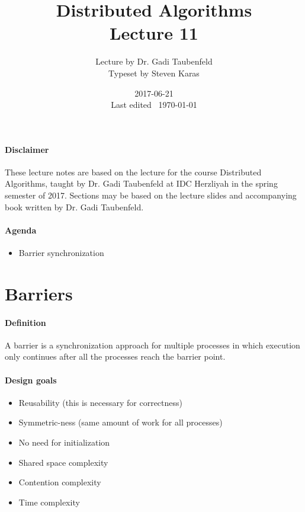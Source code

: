 \documentclass{idc_msc}
\title{Distributed Algorithms\\\large Lecture 11}
\date{2017-06-21 \\ Last edited \currenttime\ \today}
\author{Lecture by Dr. Gadi Taubenfeld\\Typeset by Steven Karas}
\begin{document}
\maketitle

\paragraph{Disclaimer}

These lecture notes are based on the lecture for the course Distributed Algorithms, taught by Dr. Gadi Taubenfeld at IDC Herzliyah in the spring semester of 2017.
Sections may be based on the lecture slides and accompanying book written by Dr. Gadi Taubenfeld.

\paragraph{Agenda}

\begin{itemize}
  \item Barrier synchronization
\end{itemize}

\section{Barriers}

\paragraph{Definition}
A barrier is a synchronization approach for multiple processes in which execution only continues after all the processes reach the barrier point.

\paragraph{Design goals}

\begin{itemize}
  \item Reusability (this is necessary for correctness)
  \item Symmetric-ness (same amount of work for all processes)
  \item No need for initialization
  \item Shared space complexity
  \item Contention complexity
  \item Time complexity
\end{itemize}
\end{document}
